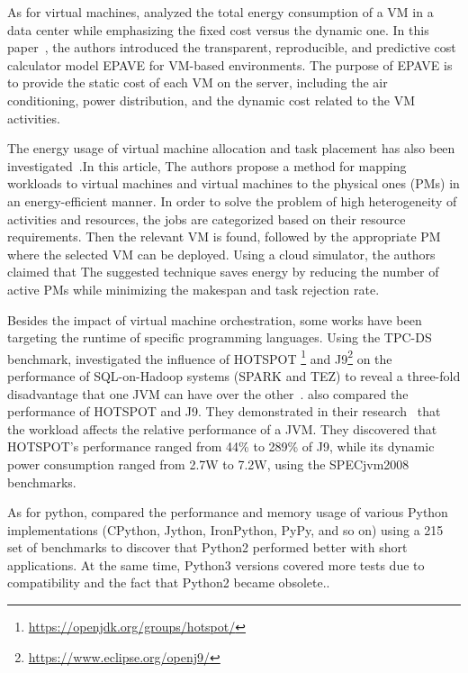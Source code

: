As for virtual machines, \citeauthor{kurpicz2016much} analyzed the total energy consumption of a VM in a data center while emphasizing the fixed cost versus the dynamic one. In this paper~\cite{kurpicz2016much}, the authors introduced the transparent, reproducible, and predictive cost calculator model EPAVE for VM-based environments. The purpose of EPAVE is to provide the static cost of each VM on the server, including the air conditioning, power distribution, and the dynamic cost related to the VM activities.

The energy usage of virtual machine allocation and task placement has also been investigated~\cite{mishra_energy_2018}.In this article, The authors propose a method for mapping workloads to virtual machines and virtual machines to the physical ones (PMs) in an energy-efficient manner. In order to solve the problem of high heterogeneity of activities and resources, the jobs are categorized based on their resource requirements. Then the relevant VM is found, followed by the appropriate PM where the selected VM can be deployed. Using a cloud simulator, the authors claimed that The suggested technique saves energy by reducing the number of active PMs while minimizing the makespan and task rejection rate.

Besides the impact of virtual machine orchestration, some works have been targeting the runtime of specific programming languages. Using the TPC-DS benchmark, \citeauthor{chiba2018towards} investigated the influence of HOTSPOT \footnote{\url{https://openjdk.org/groups/hotspot/}} and J9\footnote{\url{https://www.eclipse.org/openj9/}} on the performance of SQL-on-Hadoop systems (SPARK and TEZ) to reveal a three-fold disadvantage that one JVM can have over the other~\cite{chiba2018towards}.
\citeauthor{oi_power_2011} also compared the performance of HOTSPOT and J9. They demonstrated in their research~\cite{oi_power_2011} that the workload affects the relative performance of a JVM. They discovered that HOTSPOT's performance ranged from 44\% to 289\% of J9, while its dynamic power consumption ranged from 2.7W to 7.2W, using the SPECjvm2008~\cite{shiv2009specjvm2008} benchmarks.

As for python, \citeauthor{redondo_comprehensive_2015} compared the performance and memory usage of various Python implementations (CPython, Jython, IronPython, PyPy, and so on) using a 215 set of benchmarks to discover that Python2 performed better with short applications. At the same time, Python3 versions covered more tests due to compatibility and the fact that Python2 became obsolete.\cite{redondo_comprehensive_2015}.



